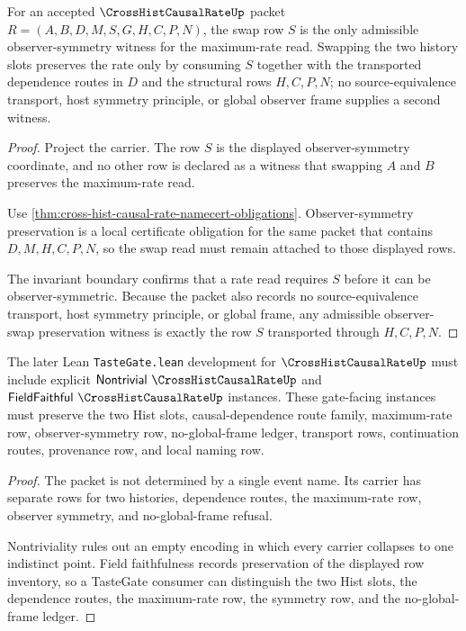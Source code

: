 \begin{theorem}
\label{thm:cross-hist-causal-rate-observer-swap-preservation}
For an accepted $\CrossHistCausalRateUp$ packet $R=(A,B,D,M,S,G,H,C,P,N)$, the swap row $S$ is the only admissible observer-symmetry witness for the maximum-rate read. Swapping the two history slots preserves the rate only by consuming $S$ together with the transported dependence routes in $D$ and the structural rows $H,C,P,N$; no source-equivalence transport, host symmetry principle, or global observer frame supplies a second witness.
\end{theorem}
\begin{proof}
Project the carrier. The row $S$ is the displayed observer-symmetry coordinate, and no other row is declared as a witness that swapping $A$ and $B$ preserves the maximum-rate read.

Use \autoref{thm:cross-hist-causal-rate-namecert-obligations}. Observer-symmetry preservation is a local certificate obligation for the same packet that contains $D,M,H,C,P,N$, so the swap read must remain attached to those displayed rows.

The invariant boundary confirms that a rate read requires $S$ before it can be observer-symmetric. Because the packet also records no source-equivalence transport, host symmetry principle, or global frame, any admissible observer-swap preservation witness is exactly the row $S$ transported through $H,C,P,N$.
\end{proof}

\begin{theorem}
\label{thm:cross-hist-causal-rate-tastegate-obligation}
The later Lean \texttt{TasteGate.lean} development for $\CrossHistCausalRateUp$ must include explicit $\mathsf{Nontrivial}\ \CrossHistCausalRateUp$ and $\mathsf{FieldFaithful}\ \CrossHistCausalRateUp$ instances. These gate-facing instances must preserve the two Hist slots, causal-dependence route family, maximum-rate row, observer-symmetry row, no-global-frame ledger, transport rows, continuation routes, provenance row, and local naming row.
\end{theorem}
\begin{proof}
The packet is not determined by a single event name. Its carrier has separate rows for two histories, dependence routes, the maximum-rate row, observer symmetry, and no-global-frame refusal.

Nontriviality rules out an empty encoding in which every carrier collapses to one indistinct point. Field faithfulness records preservation of the displayed row inventory, so a TasteGate consumer can distinguish the two Hist slots, the dependence routes, the maximum-rate row, the symmetry row, and the no-global-frame ledger.
\end{proof}

